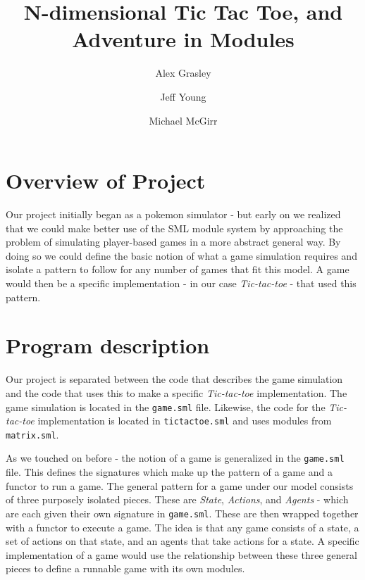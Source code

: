\documentclass[9pt,letterpaper]{extarticle}
\title{N-dimensional Tic Tac Toe, and Adventure in Modules}
\author{Alex Grasley \and Jeff Young \and Michael McGirr}
\date{}
\begin{document}
	\maketitle

  \section{Overview of Project}

  Our project initially began as a pokemon simulator - but early on we realized
  that we could make better use of the SML module system by approaching the
  problem of simulating player-based games in a more abstract general way.
  By doing so we could define the basic notion of what a game simulation requires
  and isolate a pattern to follow for any number of games that fit this
  model.
  A game would then be a specific implementation - in our case
  \textit{Tic-tac-toe} - that used this pattern.

  \section{Program description}
  
  Our project is separated between the code that describes the game simulation
  and the code that uses this to make a specific \textit{Tic-tac-toe} implementation.
  The game simulation is located in the \texttt{game.sml} file. Likewise, the
  code for the \textit{Tic-tac-toe} implementation is located in
  \texttt{tictactoe.sml} and uses modules from \texttt{matrix.sml}.

  As we touched on before - the notion of a game is generalized in the
  \texttt{game.sml} file. This defines the signatures which make up the pattern
  of a game and a functor to run a game.
  The general pattern for a game under our model consists of three purposely
  isolated pieces.
  These are \textit{State}, \textit{Actions}, and \textit{Agents} - which are
  each given their own signature in \texttt{game.sml}.
  These are then wrapped together with a functor to execute a game.
  The idea is that any game consists of a state, a set of actions on that state,
  and an agents that take actions for a state. A specific implementation of a
  game would use the relationship between these three general pieces to define
  a runnable game with its own modules.
\end{document}
